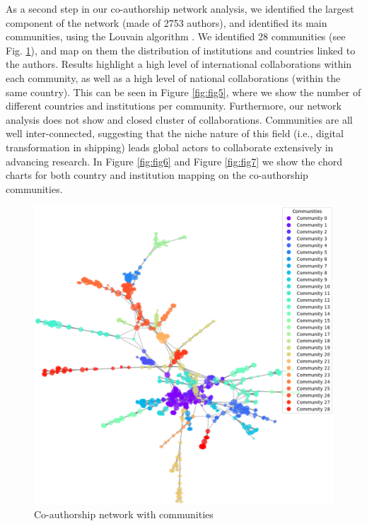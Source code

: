 \documentclass[a4paper, review, endfloat, doubleblind, authoryear]{elsarticle}
\begin{document}
	As a second step in our co-authorship network analysis, we identified the largest component of the network (made of 2753 authors), and identified its main communities, using the Louvain algorithm \citep{blondel2008fast}. We identified 28 communities (see Fig. \ref{fig:fig4}), and map on them the distribution of institutions and countries linked to the authors. Results highlight a high level of international collaborations within each community, as well as a high level of national collaborations (within the same country). This can be seen in Figure \ref{fig:fig5}, where we show the number of different countries and institutions per community. Furthermore, our network analysis does not show and closed cluster of collaborations. Communities are all well inter-connected, suggesting that the niche nature of this field (i.e., digital transformation in shipping) leads global actors to collaborate extensively in advancing research. In Figure \ref{fig:fig6} and Figure \ref{fig:fig7} we show the chord charts for both country and institution mapping on the co-authorship communities.
	
	\begin{figure}[htbp]
		\centering
		\includegraphics[width=\linewidth]{pics/co-authorship_communities.eps}
		\caption{Co-authorship network with communities}\label{fig:fig4}
	\end{figure}
	
\end{document}
